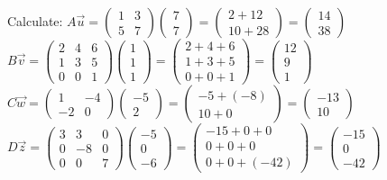 \documentclass[a4paper]{report}
\begin{document}
\begin{Answer}[ref=linalg:mat:8]
\Question Calculate:
\subQuestion $A\vec{u}=\begin{pmatrix}1&3\\5&7\end{pmatrix}\begin{pmatrix}7\\7\end{pmatrix}= \begin{pmatrix}2+12\\10+28\end{pmatrix}=\begin{pmatrix}14\\38\end{pmatrix}$
\subQuestion $B\vec{v}=\begin{pmatrix}2&4&6\\1&3&5\\0&0&1\end{pmatrix}\begin{pmatrix}1\\1\\1\end{pmatrix}=\begin{pmatrix}2+4+6\\1+3+5\\0+0+1\end{pmatrix}=\begin{pmatrix}12\\9\\1\end{pmatrix}$
\subQuestion $C\vec{w}=\begin{pmatrix}1&-4\\-2&0\end{pmatrix}\begin{pmatrix}-5\\2\end{pmatrix}=\begin{pmatrix}-5+(-8)\\10+0\end{pmatrix}=\begin{pmatrix}-13\\10\end{pmatrix}$
\subQuestion $D\vec{z}=\begin{pmatrix}3&3&0\\0&-8&0\\0&0&7\end{pmatrix}\begin{pmatrix}-5\\0\\-6\end{pmatrix}=\begin{pmatrix}-15+0+0\\0+0+0\\0+0+(-42)\end{pmatrix}=\begin{pmatrix}-15\\0\\-42\end{pmatrix}$
\end{Answer}
\end{document}
